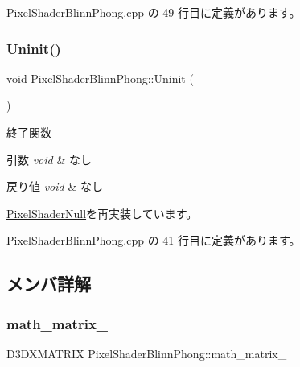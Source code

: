  Pixel\+Shader\+Blinn\+Phong.\+cpp の 49 行目に定義があります。

\mbox{\label{class_pixel_shader_blinn_phong_a50450f0ad9c6c0ad011361ee153088af}} 
\subsubsection{\texorpdfstring{Uninit()}{Uninit()}}
{\footnotesize\ttfamily void Pixel\+Shader\+Blinn\+Phong\+::\+Uninit (\begin{DoxyParamCaption}{ }\end{DoxyParamCaption})\hspace{0.3cm}{\ttfamily [virtual]}}



終了関数 


\begin{DoxyParams}{引数}
{\em void} & なし \\
\hline
\end{DoxyParams}

\begin{DoxyRetVals}{戻り値}
{\em void} & なし \\
\hline
\end{DoxyRetVals}


\mbox{\hyperlink{class_pixel_shader_null_adca4c44cd25c90a5ebd75b459f5e641e}{Pixel\+Shader\+Null}}を再実装しています。



 Pixel\+Shader\+Blinn\+Phong.\+cpp の 41 行目に定義があります。



\subsection{メンバ詳解}
\mbox{\label{class_pixel_shader_blinn_phong_a5647e2717c06218e1ead9a9dbd6a95fb}} 
\subsubsection{\texorpdfstring{math\+\_\+matrix\+\_\+}{math\_matrix\_}}
{\footnotesize\ttfamily D3\+D\+X\+M\+A\+T\+R\+IX Pixel\+Shader\+Blinn\+Phong\+::math\+\_\+matrix\+\_\+\hspace{0.3cm}{\ttfamily [private]}}



